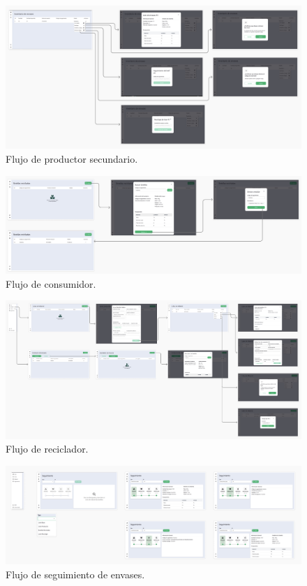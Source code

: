 \begin{figure}[!htb]
	\centering
	\includegraphics[width=\linewidth]{Figures/flow-secondary-producer.png}
	\caption{Flujo de productor secundario.}
  \label{fig:flow-secondary-producer}
\end{figure}

\begin{figure}[!htb]
	\centering
	\includegraphics[width=\linewidth]{Figures/flow-consumer.png}
	\caption{Flujo de consumidor.}
  \label{fig:flow-consumer}
\end{figure}

\begin{figure}[!htb]
	\centering
	\includegraphics[width=\linewidth]{Figures/flow-recycler.png}
	\caption{Flujo de reciclador.}
  \label{fig:flow-recycler}
\end{figure}

\begin{figure}[!htb]
	\centering
	\includegraphics[width=\linewidth]{Figures/flow-tracking.png}
	\caption{Flujo de seguimiento de envases.}
  \label{fig:flow-tracking}
\end{figure}